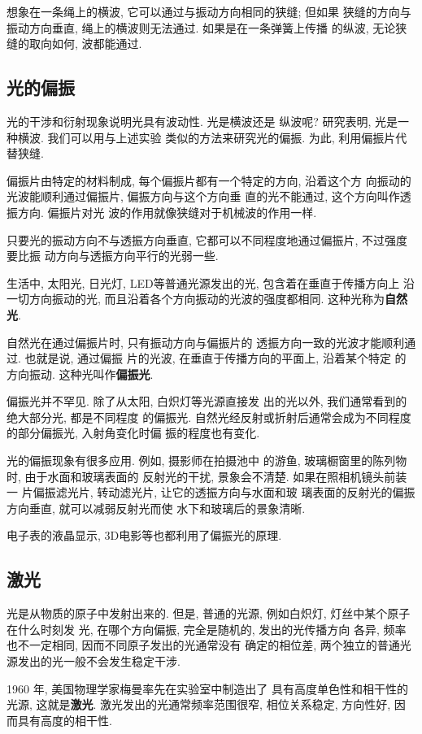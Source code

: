 \documentclass[11pt,a4paper]{ctexbook}
\begin{document}
想象在一条绳上的横波, 它可以通过与振动方向相同的狭缝; 但如果
狭缝的方向与振动方向垂直, 绳上的横波则无法通过. 如果是在一条弹簧上传播
的纵波, 无论狭缝的取向如何, 波都能通过.

\subsection{光的偏振}
光的干涉和衍射现象说明光具有波动性. 光是横波还是
纵波呢? 研究表明, 光是一种横波. 我们可以用与上述实验
类似的方法来研究光的偏振. 为此, 利用偏振片代替狭缝.

偏振片由特定的材料制成, 每个偏振片都有一个特定的方向, 沿着这个方
向振动的光波能顺利通过偏振片, 偏振方向与这个方向垂
直的光不能通过, 这个方向叫作透振方向. 偏振片对光
波的作用就像狭缝对于机械波的作用一样.

只要光的振动方向不与透振方向垂直,
它都可以不同程度地通过偏振片, 不过强度要比振
动方向与透振方向平行的光弱一些.

生活中, 太阳光, 日光灯, LED等普通光源发出的光, 包含着在垂直于传播方向上
沿一切方向振动的光, 而且沿着各个方向振动的光波的强度都相同.
这种光称为\textbf{自然光}.

自然光在通过偏振片时, 只有振动方向与偏振片的
透振方向一致的光波才能顺利通过. 也就是说, 通过偏振
片的光波, 在垂直于传播方向的平面上, 沿着某个特定
的方向振动. 这种光叫作\textbf{偏振光}.

偏振光并不罕见. 除了从太阳, 白炽灯等光源直接发
出的光以外, 我们通常看到的绝大部分光, 都是不同程度
的偏振光. 自然光经反射或折射后通常会成为不同程度的部分偏振光, 入射角变化时偏
振的程度也有变化.

光的偏振现象有很多应用. 例如, 摄影师在拍摄池中
的游鱼, 玻璃橱窗里的陈列物时, 由于水面和玻璃表面的
反射光的干扰, 景象会不清楚. 如果在照相机镜头前装一
片偏振滤光片, 转动滤光片, 让它的透振方向与水面和玻
璃表面的反射光的偏振方向垂直, 就可以减弱反射光而使
水下和玻璃后的景象清晰.

电子表的液晶显示, 3D电影等也都利用了偏振光的原理.

\subsection{激光}
光是从物质的原子中发射出来的. 但是,
普通的光源, 例如白炽灯, 灯丝中某个原子在什么时刻发
光, 在哪个方向偏振, 完全是随机的, 发出的光传播方向
各异, 频率也不一定相同, 因而不同原子发出的光通常没有
确定的相位差, 两个独立的普通光源发出的光一般不会发生稳定干涉.

1960 年, 美国物理学家梅曼率先在实验室中制造出了
具有高度单色性和相干性的光源,
这就是\textbf{激光}. 激光发出的光通常频率范围很窄, 相位关系稳定, 方向性好, 因而具有高度的相干性.
\end{document}
